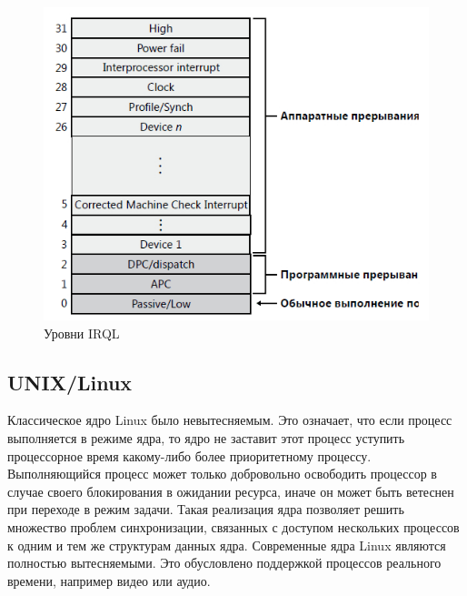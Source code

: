 \documentclass[14pt, a4paper]{extarticle}
\begin{document}
 	\begin{figure}[h!]
 		\centering
 		\includegraphics[scale=1]{source/arhitektura-86.png}
 		\caption*{Уровни IRQL}
 	\end{figure}
 
 	\subsection{UNIX/Linux}
 	Классическое ядро Linux было невытесняемым. Это означает, что если процесс выполняется
 	в режиме ядра, то ядро не заставит этот процесс уступить процессорное время какому-либо более приоритетному
 	процессу. Выполняющийся процесс может только добровольно освободить процессор в случае своего блокирования
 	в ожидании ресурса, иначе он может быть ветеснен при переходе в режим задачи. Такая реализация ядра позволяет решить множество проблем синхронизации, связанных с доступом нескольких процессов к одним и тем же
 	структурам данных ядра.
 	Современные ядра Linux являются полностью вытесняемыми. Это обусловлено поддержкой процессов реального времени, например видео или аудио.\par
 	
\end{document}
